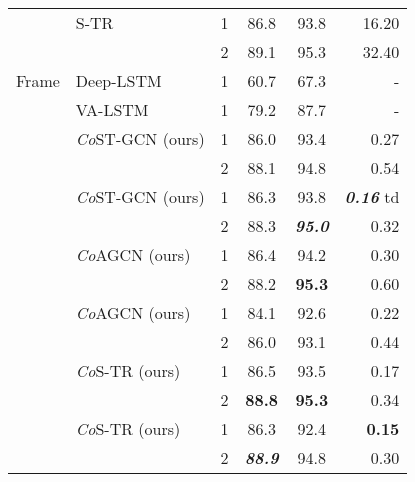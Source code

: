 \documentclass[journal]{IEEEtran}
\newcommand\paretocolor{lgreen!20}
\theoremstyle{definition}
\begin{document}
\begin{table}[!btp]
\begin{center}
{\begin{tabular}{llcccr}
    & S-TR                                & 1             & 86.8  & 93.8    & 16.20 \\ 
    &                                               & 2             & 89.1  & 95.3    & 32.40 \\
    
    \midrule
    
    Frame
    & Deep-LSTM~\cite{Shahroudy_2016_NTURGBD}       & 1             & 60.7  & 67.3    & - \\ 
    & VA-LSTM~\cite{zhang2017view}                  & 1             & 79.2  & 87.7    & - \\ 
    \addlinespace[0.5ex] \cline{2-6} \addlinespace[0.5ex]
    & \textit{Co}ST-GCN (ours)                      & 1             & 86.0  & 93.4    & 0.27 \\
    &                                               & 2             & 88.1  & 94.8    & 0.54 \\
    & \textit{Co}ST-GCN (ours)                  & 1             & 86.3  & \colorbox{\paretocolor}{93.8}    & \colorbox{\paretocolor}{\textbf{\textit{0.16}}} td\\
    &                                               & 2             & 88.3  & \colorbox{\paretocolor}{\textbf{\textit{95.0}}}    &  \colorbox{\paretocolor}{0.32} \\
    & \textit{Co}AGCN (ours)                        & 1             & 86.4  & 94.2    & 0.30 \\
    &                                               & 2             & 88.2  & \textbf{95.3}    & 0.60 \\
    & \textit{Co}AGCN (ours)                    & 1             & 84.1  & 92.6    & 0.22 \\
    &                                               & 2             & 86.0  & 93.1    & 0.44 \\
    & \textit{Co}S-TR (ours)                        & 1             & \colorbox{\paretocolor}{86.5}  & 93.5    & \colorbox{\paretocolor}{0.17} \\
    &                                               & 2             & \colorbox{\paretocolor}{\textbf{88.8}}  & \colorbox{\paretocolor}{\textbf{95.3}}    & \colorbox{\paretocolor}{0.34} \\
    & \textit{Co}S-TR (ours)                    & 1             & \colorbox{\paretocolor}{86.3}  & \colorbox{\paretocolor}{92.4}    &  \colorbox{\paretocolor}{\textbf{0.15}} \\
    &                                               & 2             & \colorbox{\paretocolor}{\textbf{\textit{88.9}}}  & \colorbox{\paretocolor}{94.8}    & \colorbox{\paretocolor}{0.30} \\
    \bottomrule
\end{tabular}
}
\end{center}
\end{table}
\end{document}
